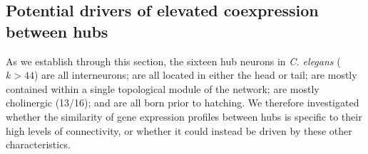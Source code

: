 \documentclass[10pt,letterpaper]{article}
\begin{document}
\subsection*{Potential drivers of elevated coexpression between hubs}
As we establish through this section, the sixteen hub neurons in \emph{C. elegans} ($k > 44$)
are all interneurons;
are all located in either the head or tail;
are mostly contained within a single topological module of the network;
are mostly cholinergic (13/16);
and are all born prior to hatching.
We therefore investigated whether the similarity of gene expression profiles between hubs is specific to their high levels of connectivity, or whether it could instead be driven by these other characteristics.


\end{document}
